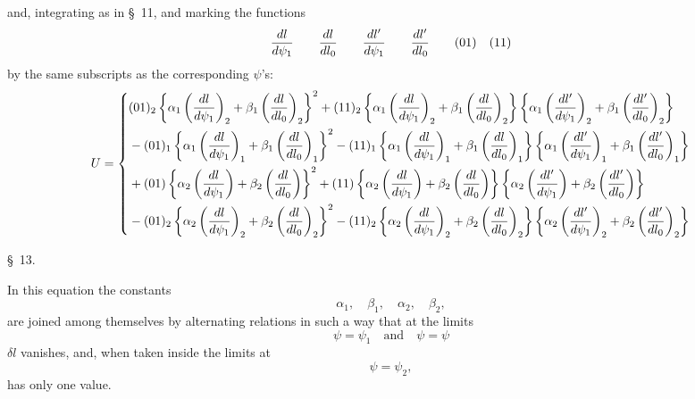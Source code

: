 and, integrating as in \S\ 11, and marking the functions
\[
 {dl\over d\psi_1}\qquad {dl\over dl_0}\qquad {dl'\over d\psi_1}\qquad {dl'\over dl_0}\qquad (01)\quad (11)
\]
by the same subscripts as the corresponding $\psi$'s:
\begingroup\scriptsize
\[
\begin{aligned}
U=\left\{\begin{aligned}
&(01)_2\left\{\alpha_1\left({dl\over d\psi_1}\right)_2+\beta_1\left({dl\over dl_0}\right)_2\right\}^2
 +(11)_2\left\{\alpha_1\left({dl\over d\psi_1}\right)_2+\beta_1\left({dl\over dl_0}\right)_2\right\}
 \left\{\alpha_1\left({dl'\over d\psi_1}\right)_2+\beta_1\left({dl'\over dl_0}\right)_2\right\}\\
&-(01)_1\left\{\alpha_1\left({dl\over d\psi_1}\right)_1+\beta_1\left({dl\over dl_0}\right)_1\right\}^2
 -(11)_1\left\{\alpha_1\left({dl\over d\psi_1}\right)_1+\beta_1\left({dl\over dl_0}\right)_1\right\}
 \left\{\alpha_1\left({dl'\over d\psi_1}\right)_1+\beta_1\left({dl'\over dl_0}\right)_1\right\}\\
&+(01)\left\{\alpha_2\left({dl\over d\psi_1}\right)+\beta_2\left({dl\over dl_0}\right)\right\}^2
 +(11)\left\{\alpha_2\left({dl\over d\psi_1}\right)+\beta_2\left({dl\over dl_0}\right)\right\}
 \left\{\alpha_2\left({dl'\over d\psi_1}\right)+\beta_2\left({dl'\over dl_0}\right)\right\}\\
&-(01)_2\left\{\alpha_2\left({dl\over d\psi_1}\right)_2+\beta_2\left({dl\over dl_0}\right)_2\right\}^2
 -(11)_2\left\{\alpha_2\left({dl\over d\psi_1}\right)_2+\beta_2\left({dl\over dl_0}\right)_2\right\}
 \left\{\alpha_2\left({dl'\over d\psi_1}\right)_2+\beta_2\left({dl'\over dl_0}\right)_2\right\}
\end{aligned}\right.
\end{aligned}
\]
\endgroup

\begin{center}\S\ 13.\end{center}

In this equation the constants
\[
 \alpha_1,\quad \beta_1,\quad \alpha_2,\quad \beta_2,
\]
are joined among themselves by alternating relations in such a way that at the limits
\[
 \psi=\psi_1 \quad\text{and}\quad \psi=\psi
\]
$\delta l$ vanishes, and, when taken inside the limits at
\[
 \psi=\psi_2,
\]
has only one value.

